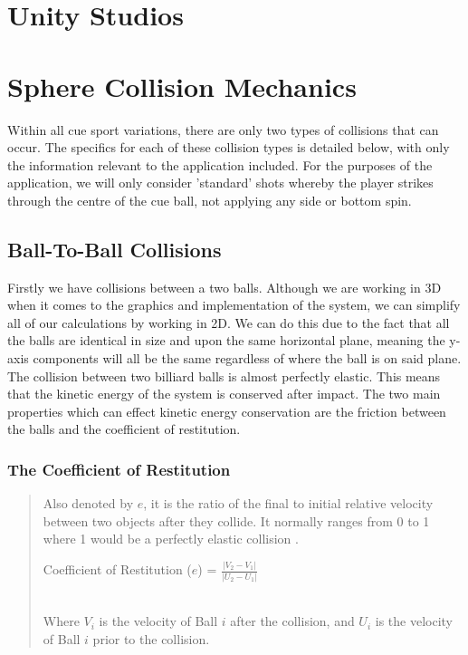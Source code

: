 \documentclass[ %
                author={Finn Alexander Wilkinson},
                supervisor={Dr. Andrew Calway},
                degree={MEng},
                title={\centering A Mixed Reality Aim Assistant for Pool and Snooker},
                subtitle={},
                type={Enterprise},
                year={2021} ]{dissertation}
\begin{document}
\section{Unity Studios}

\section{Sphere Collision Mechanics}
Within all cue sport variations, there are only two types of collisions that can occur. The specifics for each of these collision types is detailed below, with only the information relevant to the application included. For the purposes of the application, we will only consider 'standard' shots whereby the player strikes through the centre of the cue ball, not applying any side or bottom spin.

\subsection{Ball-To-Ball Collisions}
Firstly we have collisions between a two balls. Although we are working in 3D when it comes to the graphics and implementation of the system, we can simplify all of our calculations by working in 2D. We can do this due to the fact that all the balls are identical in size and upon the same horizontal plane, meaning the y-axis components will all be the same regardless of where the ball is on said plane.\\

The collision between two billiard balls is almost perfectly elastic. This means that the kinetic energy of the system is conserved after impact. The two main properties which can effect kinetic energy conservation are the friction between the balls and the coefficient of restitution.

\subsubsection{The Coefficient of Restitution}
    \begin{quote}
        Also denoted by \(e\), it is the ratio of the final to initial relative velocity between two objects after they collide. It normally ranges from 0 to 1 where 1 would be a perfectly elastic collision \cite{coefOfRestitutionDef}.\\
        \newline
        \centerline{Coefficient of Restitution (\(e\)) = \(\frac{|V_2 - V_1|}{|U_2-U_1|}\)}\\
        \newline
        Where \(V_i\) is the velocity of Ball \(i\) after the collision, and \(U_i\) is the velocity of Ball \(i\) prior to the collision.
    \end{quote}
    
\end{document}
